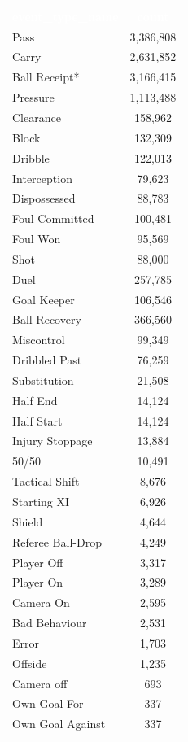 \documentclass[12pt,a4paper]{article}
\newcommand{\thead}[1]{%
  \cellcolor{tableheader}\textcolor{white}{\textbf{#1}}%
}
\begin{document}
\begin{center}
\small
\begin{tabular}{lc}
\rowcolor{tableheader}
\thead{event\_type\_name} & \thead{count} \\

\rowcolor{tablealt} Pass & 3,386,808 \\
\rowcolor{tablerow} Carry & 2,631,852 \\
\rowcolor{tablealt} Ball Receipt* & 3,166,415 \\
\rowcolor{tablerow} Pressure & 1,113,488 \\
\rowcolor{tablealt} Clearance & 158,962 \\
\rowcolor{tablerow} Block & 132,309 \\
\rowcolor{tablealt} Dribble & 122,013 \\
\rowcolor{tablerow} Interception & 79,623 \\
\rowcolor{tablealt} Dispossessed & 88,783 \\
\rowcolor{tablerow} Foul Committed & 100,481 \\
\rowcolor{tablealt} Foul Won & 95,569 \\
\rowcolor{tablerow} Shot & 88,000 \\
\rowcolor{tablealt} Duel & 257,785 \\
\rowcolor{tablerow} Goal Keeper & 106,546 \\
\rowcolor{tablealt} Ball Recovery & 366,560 \\
\rowcolor{tablerow} Miscontrol & 99,349 \\
\rowcolor{tablealt} Dribbled Past & 76,259 \\
\rowcolor{tablerow} Substitution & 21,508 \\
\rowcolor{tablealt} Half End & 14,124 \\
\rowcolor{tablerow} Half Start & 14,124 \\
\rowcolor{tablealt} Injury Stoppage & 13,884 \\
\rowcolor{tablerow} 50/50 & 10,491 \\
\rowcolor{tablealt} Tactical Shift & 8,676 \\
\rowcolor{tablerow} Starting XI & 6,926 \\
\rowcolor{tablealt} Shield & 4,644 \\
\rowcolor{tablerow} Referee Ball-Drop & 4,249 \\
\rowcolor{tablealt} Player Off & 3,317 \\
\rowcolor{tablerow} Player On & 3,289 \\
\rowcolor{tablealt} Camera On & 2,595 \\
\rowcolor{tablerow} Bad Behaviour & 2,531 \\
\rowcolor{tablealt} Error & 1,703 \\
\rowcolor{tablerow} Offside & 1,235 \\
\rowcolor{tablealt} Camera off & 693 \\
\rowcolor{tablerow} Own Goal For & 337 \\
\rowcolor{tablealt} Own Goal Against & 337 \\

\end{tabular}
\end{center}
\end{document}
